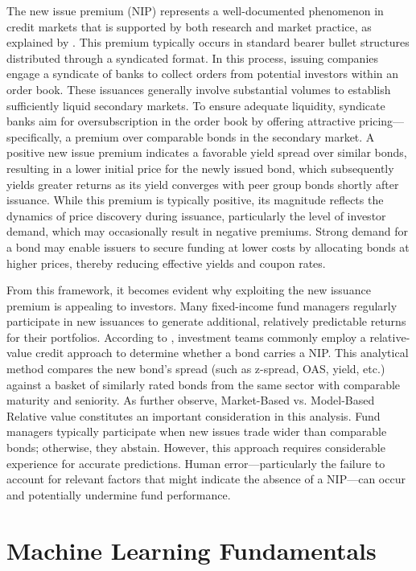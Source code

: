 The new issue premium (NIP) represents a well-documented phenomenon in credit markets that is supported by both research and market practice, as explained by \parencite{TraczykNewFactor}. This premium typically occurs in standard bearer bullet structures distributed through a syndicated format. In this process, issuing companies engage a syndicate of banks to collect orders from potential investors within an order book. These issuances generally involve substantial volumes to establish sufficiently liquid secondary markets. To ensure adequate liquidity, syndicate banks aim for oversubscription in the order book by offering attractive pricing—specifically, a premium over comparable bonds in the secondary market. A positive new issue premium indicates a favorable yield spread over similar bonds, resulting in a lower initial price for the newly issued bond, which subsequently yields greater returns as its yield converges with peer group bonds shortly after issuance. While this premium is typically positive, its magnitude reflects the dynamics of price discovery during issuance, particularly the level of investor demand, which may occasionally result in negative premiums. Strong demand for a bond may enable issuers to secure funding at lower costs by allocating bonds at higher prices, thereby reducing effective yields and coupon rates.

From this framework, it becomes evident why exploiting the new issuance premium is appealing to investors. Many fixed-income fund managers regularly participate in new issuances to generate additional, relatively predictable returns for their portfolios. According to \textcite[chap. 35]{Fabozzi2021TheEdition}, investment teams commonly employ a relative-value credit approach to determine whether a bond carries a NIP. This analytical method compares the new bond's spread (such as z-spread, OAS, yield, etc.) against a basket of similarly rated bonds from the same sector with comparable maturity and seniority. As \textcite{fabozzi2025handbook} further observe, Market-Based vs. Model-Based Relative value constitutes an important consideration in this analysis. Fund managers typically participate when new issues trade wider than comparable bonds; otherwise, they abstain. However, this approach requires considerable experience for accurate predictions. Human error—particularly the failure to account for relevant factors that might indicate the absence of a NIP—can occur and potentially undermine fund performance.

\section{Machine Learning Fundamentals}

